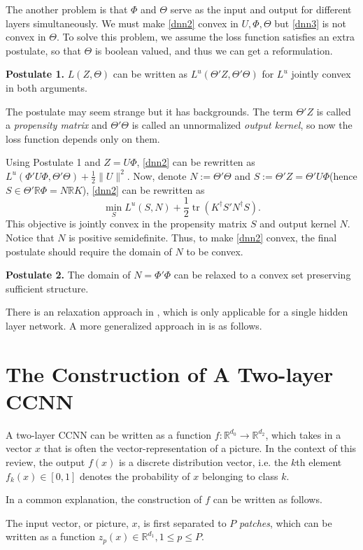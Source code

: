 \documentclass{article}
\DeclareMathOperator{\tr}{tr}
\begin{document}
The another problem is that $\Phi$ and $\Theta$ serve as the input and output for different layers simultaneously. We must make \eqref{dnn2} convex in $U,\Phi,\Theta$ but \eqref{dnn3} is not convex in $\Theta$. To solve this problem, we assume the loss function satisfies an extra postulate, so that $\Theta$ is boolean valued, and thus we can get a reformulation.

\textbf{Postulate 1.} $L(Z,\Theta)$ can be written as $L^u(\Theta'Z,\Theta'\Theta)$ for $L^u$ jointly convex in both arguments.

The postulate may seem strange but it has backgrounds. The term $\Theta'Z$ is called a \emph{propensity matrix} and $\Theta'\Theta$ is called an unnormalized \emph{output kernel}, so now the loss function depends only on them. 

Using Postulate 1 and $Z=U\Phi$, \eqref{dnn2} can be rewritten as $L^u(\Phi'U\Phi,\Theta'\Theta)+\frac{1}{2}\|U\|^2$. Now, denote $N:=\Theta'\Theta$ and $S:=\Theta'Z=\Theta'U\Phi$(hence $S\in\Theta'\mathbb{R}\Phi=N\mathbb{R}K$), \eqref{dnn2} can be rewritten as
\[\min_SL^u(S,N)+\frac{1}{2}\tr(K^\dagger S'N^\dagger S).\]
This objective is jointly convex in the propensity matrix $S$ and output kernel $N$. Notice that $N$ is positive semidefinite. Thus, to make \eqref{dnn2} convex, the final postulate should require the domain of $N$ to be convex.

\textbf{Postulate 2.} The domain of $N=\Phi'\Phi$ can be relaxed to a convex set preserving sufficient structure.

There is an relaxation approach in \cite{aslan2013convex}, which is only applicable for a single hidden layer network. A more generalized approach in \cite{aslan2014convex} is as follows.



\section{The Construction of A Two-layer CCNN}
A two-layer CCNN can be written as a function $f:\mathbb{R}^{d_0}\rightarrow\mathbb{R}^{d_2}$, which takes in a vector $x$ that is often the vector-representation of a picture. In the context of this review, the output $f(x)$ is a discrete distribution vector, i.e. the $k$th element $f_k(x)\in\left[0,1\right] $ denotes the probability of $x$ belonging to class $k$.

In a common explanation, the construction of $f$ can be written as follows.

The input vector, or picture, $x$, is first separated to $P$ \emph{patches}, which can be written as a function $z_p(x)\in\mathbb{R}^{d_1},1\leq p\leq P$.
\end{document}
